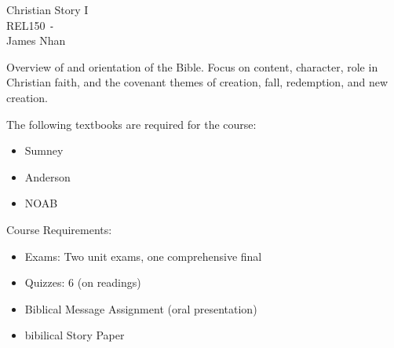 \documentclass{article}
\begin{document}
\begin{titlepage}
\begin{center}
    {\large Christian Story I} \\
    REL150 \texttt{-} \longdate{\today} \\
    James Nhan
\end{center}
\end{titlepage}

Overview of and orientation of the Bible. Focus on content, character, role in Christian faith, and the covenant themes of creation, fall, redemption, and new creation.
\vspace{10pt}

\noindent The following textbooks are required for the course:

\begin{itemize}
    \item Sumney
    \item Anderson
    \item NOAB
\end{itemize}

\noindent Course Requirements:

\begin{itemize}
    \item Exams: Two unit exams, one comprehensive final
    \item Quizzes: 6 (on readings)
    \item Biblical Message Assignment (oral presentation)
    \item bibilical Story Paper
\end{itemize}
\end{document}
